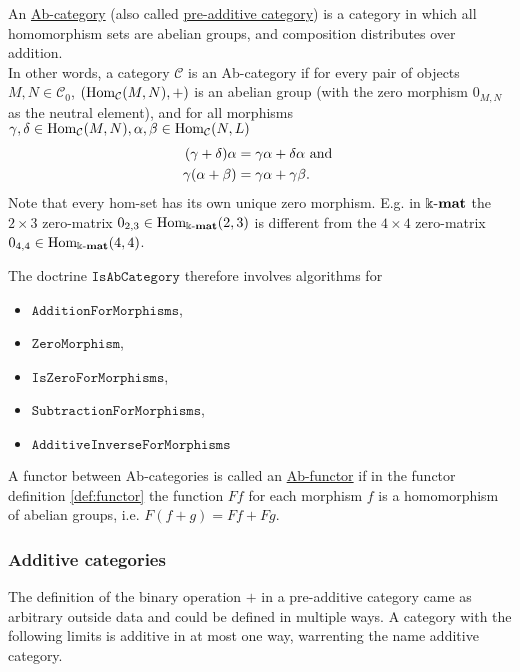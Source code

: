 \begin{definition}[Ab-category]
An \ul{Ab-category} (also called \ul{pre-additive category}) is a category in which all homomorphism sets are abelian groups,
and composition distributes over addition.\\
In other words, a category $\mathcal{C}$ is an Ab-category if for every pair of objects $M,N \in \mathcal{C}_{0}$,
$( \textup{Hom}_{\mathcal{C}}(M,N), + )$ is an abelian group (with the zero morphism $0_{M,N}$ as the neutral element),
and for all morphisms $\gamma, \delta \in \mathrm{Hom}_{\mathcal{C}}(M,N),
\alpha, \beta \in \textup{Hom}_{\mathcal{C}}(N,L)$
\begin{align}
(\gamma + \delta)\alpha &=\label{eq:dist1} \gamma\alpha + \delta\alpha \textup{ and }\\
\gamma(\alpha+\beta) &=\label{eq:dist2} \gamma\alpha + \gamma\beta.
\end{align}
Note that every hom-set has its own unique zero morphism. E.g. in $\Bbbk\textnormal{-}\mathbf{mat}$ the $2 \times 3$ zero-matrix
$0_{2,3} \in \textup{Hom}_{\Bbbk\textnormal{-}\mathbf{mat}}(2,3)$ is different from the $4 \times 4$ zero-matrix $0_{4,4} \in \textup{Hom}_{\Bbbk\textnormal{-}\mathbf{mat}}(4,4)$.
\end{definition}

\begin{doctrine}[Ab-category]
The doctrine $\mathtt{IsAbCategory}$ therefore involves algorithms for
\begin{itemize}
\item $\mathtt{AdditionForMorphisms}$,
\item $\mathtt{ZeroMorphism}$,
\item $\mathtt{IsZeroForMorphisms}$,
\item $\mathtt{SubtractionForMorphisms}$,
\item $\mathtt{AdditiveInverseForMorphisms}$
\end{itemize}
\end{doctrine}

\begin{definition}[Ab-functor]
A functor between Ab-categories is called an \ul{Ab-functor} if in the functor definition \ref{def:functor} the function $Ff$ for each
morphism $f$ is a homomorphism of abelian groups, i.e. $F(f+g) = Ff + Fg$.
\end{definition}

\subsubsection{Additive categories}
The definition of the binary operation $+$ in a pre-additive category came as arbitrary outside data and could be defined
in multiple ways. A category with the following limits is additive in at most one way, warrenting the name additive category.

